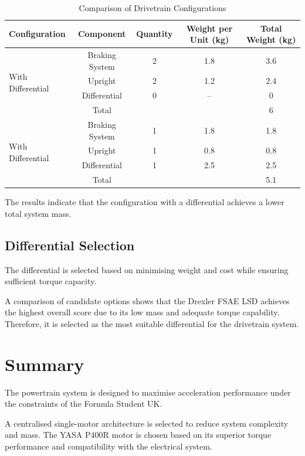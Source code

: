 \documentclass[11pt, a4paper]{report}
\numberwithin{equation}{section}
\begin{document}
\begin{table}[H]
\centering
\caption{Comparison of Drivetrain Configurations}
\label{tab:drivetrain_comparison}
\begin{tabular}{lcccc}
\toprule
Configuration & Component & Quantity & Weight per Unit (kg) & Total Weight (kg) \\
\midrule
\multirow{4}{*}{With Differential}
& Braking System & 2 & 1.8 & 3.6 \\
& Upright & 2 & 1.2 & 2.4 \\
& Differential & 0 & -- & 0 \\
& Total & & & 6 \\
\midrule
\multirow{4}{*}{With Differential} 
& Braking System & 1 & 1.8 & 1.8 \\
& Upright & 1 & 0.8 & 0.8 \\
& Differential & 1 & 2.5 & 2.5 \\
& Total & & & 5.1 \\
\bottomrule
\end{tabular}
\end{table}

The results indicate that the configuration with a differential achieves a lower total system mass.

\subsection{Differential Selection}

The differential is selected based on minimising weight and cost while ensuring sufficient torque capacity.

A comparison of candidate options shows that the Drexler FSAE LSD \cite{Drexler_FSAE_LSD_data_sheet}
achieves the highest overall score due to its low mass and adequate torque capability. Therefore, it is selected as the most suitable differential for the drivetrain system.

\section{Summary}

The powertrain system is designed to maximise acceleration performance under the constraints of the Formula Student UK.

A centralised single-motor architecture is selected to reduce system complexity and mass. The YASA P400R motor is chosen based on its superior torque performance and compatibility with the electrical system.
\end{document}
